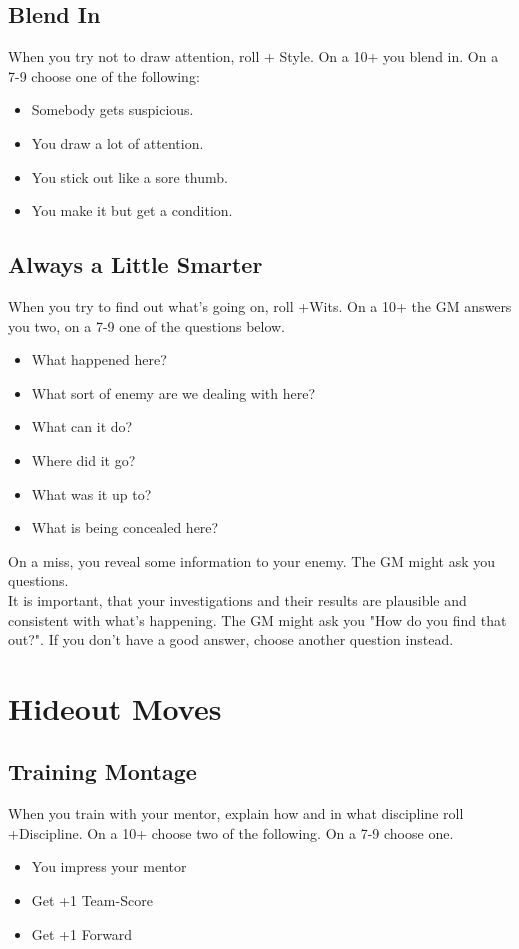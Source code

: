 \documentclass{book}
\begin{document}
\section*{Blend In}
When you try not to draw attention, roll + Style. On a 10+ you blend in. On a 7-9 choose one of the following:
\begin{itemize}
    \item Somebody gets suspicious.
    \item You draw a lot of attention.
    \item You stick out like a sore thumb.
    \item You make it but get a condition.
\end{itemize}

\section*{Always a Little Smarter}
When you try to find out what's going on, roll +Wits. On a 10+ the GM answers you two, on a 7-9 one of the questions below.
\begin{itemize}
    \item What happened here?
    \item What sort of enemy are we dealing with here?
    \item What can it do?
    \item Where did it go?
    \item What was it up to?
    \item What is being concealed here?
\end{itemize}
On a miss, you reveal some information to your enemy. The GM might ask you questions.\\
It is important, that your investigations and their results are plausible and consistent with what's happening. The GM might ask you "How do you find that out?". If you don't have a good answer, choose another question instead.

\chapter*{Hideout Moves}
\section*{Training Montage}
When you train with your mentor, explain how and in what discipline roll +Discipline. On a 10+ choose two of the following. On a 7-9 choose one.
\begin{itemize}
    \item You impress your mentor
    \item Get +1 Team-Score
    \item Get +1 Forward
\end{itemize}
\end{document}
